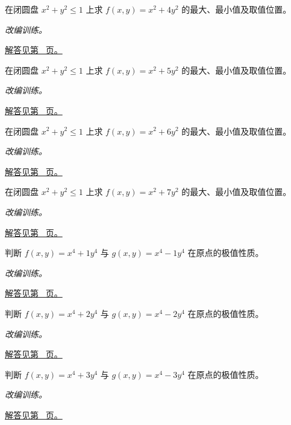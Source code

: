 \documentclass[12pt,fontset=fandol]{ctexart}
\begin{document}
\begin{example}[圆盘上的二次型]\label{ex:c35q15}
在闭圆盘 $x^2+y^2\le1$ 上求 $f(x,y)=x^2+4y^2$ 的最大、最小值及取值位置。
\par\textit{改编训练。}\par\hyperref[ans:c35q15]{解答见第~\pageref{ans:c35q15} 页。}
\end{example}
\begin{example}[圆盘上的二次型]\label{ex:c35q16}
在闭圆盘 $x^2+y^2\le1$ 上求 $f(x,y)=x^2+5y^2$ 的最大、最小值及取值位置。
\par\textit{改编训练。}\par\hyperref[ans:c35q16]{解答见第~\pageref{ans:c35q16} 页。}
\end{example}
\begin{example}[圆盘上的二次型]\label{ex:c35q17}
在闭圆盘 $x^2+y^2\le1$ 上求 $f(x,y)=x^2+6y^2$ 的最大、最小值及取值位置。
\par\textit{改编训练。}\par\hyperref[ans:c35q17]{解答见第~\pageref{ans:c35q17} 页。}
\end{example}
\begin{example}[圆盘上的二次型]\label{ex:c35q18}
在闭圆盘 $x^2+y^2\le1$ 上求 $f(x,y)=x^2+7y^2$ 的最大、最小值及取值位置。
\par\textit{改编训练。}\par\hyperref[ans:c35q18]{解答见第~\pageref{ans:c35q18} 页。}
\end{example}
\begin{example}\label{ex:c35q19}
判断 $f(x,y)=x^4+1y^4$ 与 $g(x,y)=x^4-1y^4$ 在原点的极值性质。
\par\textit{改编训练。}\par\hyperref[ans:c35q19]{解答见第~\pageref{ans:c35q19} 页。}
\end{example}
\begin{example}\label{ex:c35q20}
判断 $f(x,y)=x^4+2y^4$ 与 $g(x,y)=x^4-2y^4$ 在原点的极值性质。
\par\textit{改编训练。}\par\hyperref[ans:c35q20]{解答见第~\pageref{ans:c35q20} 页。}
\end{example}
\begin{example}\label{ex:c35q21}
判断 $f(x,y)=x^4+3y^4$ 与 $g(x,y)=x^4-3y^4$ 在原点的极值性质。
\par\textit{改编训练。}\par\hyperref[ans:c35q21]{解答见第~\pageref{ans:c35q21} 页。}
\end{example}
\end{document}
